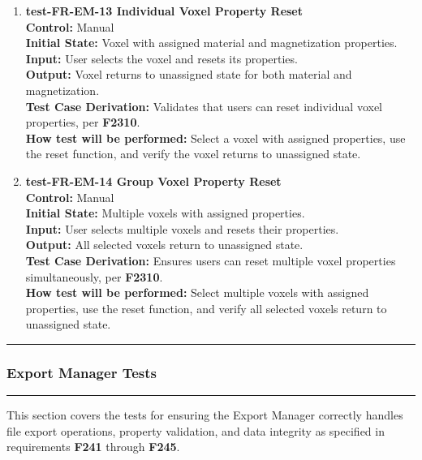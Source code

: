 \documentclass[12pt, titlepage]{article}
\begin{document}
\begin{enumerate}
  \item \textbf{test-FR-EM-13 Individual Voxel Property Reset} \\[2mm]
    \textbf{Control:} Manual \\ 
    \textbf{Initial State:} Voxel with assigned material and magnetization properties. \\ 
    \textbf{Input:} User selects the voxel and resets its properties. \\ 
    \textbf{Output:} Voxel returns to unassigned state for both material and magnetization. \\[2mm]
    \textbf{Test Case Derivation:} Validates that users can reset individual voxel properties, per \textbf{F2310}. \\[2mm]
    \textbf{How test will be performed:} Select a voxel with assigned properties, use the reset function, and verify the voxel returns to unassigned state.

  \item \textbf{test-FR-EM-14 Group Voxel Property Reset} \\[2mm]
    \textbf{Control:} Manual \\ 
    \textbf{Initial State:} Multiple voxels with assigned properties. \\ 
    \textbf{Input:} User selects multiple voxels and resets their properties. \\ 
    \textbf{Output:} All selected voxels return to unassigned state. \\[2mm]
    \textbf{Test Case Derivation:} Ensures users can reset multiple voxel properties simultaneously, per \textbf{F2310}. \\[2mm]
    \textbf{How test will be performed:} Select multiple voxels with assigned properties, use the reset function, and verify all selected voxels return to unassigned state.


\end{enumerate}

\noindent\rule{\textwidth}{0.5pt}

\subsubsection{Export Manager Tests}
\rule{\textwidth}{0.5pt}

\medskip

\noindent
This section covers the tests for ensuring the Export Manager correctly
handles file export operations, property validation, and data integrity
as specified in requirements \textbf{F241} through \textbf{F245}.
\end{document}
